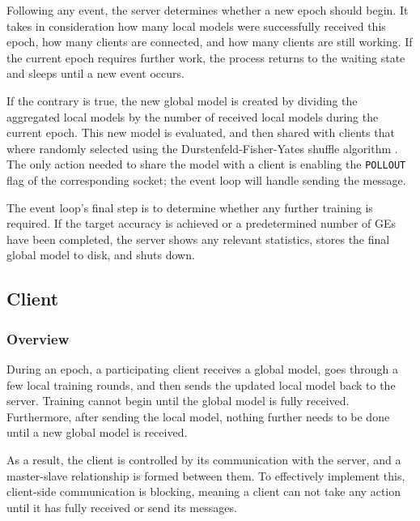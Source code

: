 Following any event, the server determines whether a new epoch should begin. It takes in consideration how many local models were successfully received this epoch, how many clients are connected, and how many clients are still working. If the current epoch requires further work, the process returns to the waiting state and sleeps until a new event occurs.

If the contrary is true, the new global model is created by dividing the aggregated local models by the number of received local models during the current epoch. This new model is evaluated, and then shared with clients that where randomly selected using the Durstenfeld-Fisher-Yates shuffle algorithm \cite{Durstenfeld_Fisher_Yates_paper, Fisher_Yates_shuffle_wiki}. The only action needed to share the model with a client is enabling the \texttt{POLLOUT} flag of the corresponding socket; the event loop will handle sending the message.

The event loop's final step is to determine whether any further training is required. If the target accuracy is achieved or a predetermined number of GEs have been completed, the server shows any relevant statistics, stores the final global model to disk, and shuts down.


\subsection{Client}
\subsubsection{Overview}
During an epoch, a participating client receives a global model, goes through a few local training rounds, and then sends the updated local model back to the server. Training cannot begin until the global model is fully received. Furthermore, after sending the local model, nothing further needs to be done until a new global model is received.

As a result, the client is controlled by its communication with the server, and a master-slave relationship is formed between them. To effectively implement this, client-side communication is blocking, meaning a client can not take any action until it has fully received or send its messages.


